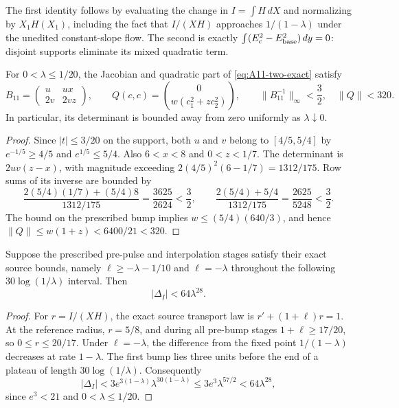 The first identity follows by evaluating the change in
$I=\int H\,dX$ and normalizing by $X_1H(X_1)$, including the
fact that $I/(XH)$ approaches $1/(1-\lambda)$ under the
unedited constant-slope flow. The second is exactly
$\int(E_c^2-E_{\rm base}^2)\,dy=0$: disjoint supports
eliminate its mixed quadratic term.

\begin{proposition}
\label{prop:A11-matrix-bound}
For $0<\lambda\le1/20$, the Jacobian and quadratic part of
\eqref{eq:A11-two-exact} satisfy
\[
 B_{11}=\begin{pmatrix}u&ux\\2v&2vz\end{pmatrix},
 \qquad Q(c,c)=\binom{0}{w(c_1^2+zc_2^2)},
 \qquad\|B_{11}^{-1}\|_\infty<\frac32,\quad\|Q\|<320.
\]
In particular, its determinant is bounded away from zero
uniformly as $\lambda\downarrow0$.
\end{proposition}
\begin{proof}
Since $|t|\le3/20$ on the support, both $u$ and $v$ belong
to $[4/5,5/4]$ by $e^{-1/5}\ge4/5$ and
$e^{1/5}\le5/4$. Also $6<x<8$ and $0<z<1/7$.
The determinant is $2uv(z-x)$, with magnitude exceeding
$2(4/5)^2(6-1/7)=1312/175$. Row sums of its inverse
are bounded by
\[
 \frac{2(5/4)(1/7)+(5/4)8}{1312/175}
 =\frac{3625}{2624}<\frac32,
 \qquad
 \frac{2(5/4)+5/4}{1312/175}
 =\frac{2625}{5248}<\frac32.
\]
The bound on the prescribed bump implies
$w\le(5/4)(640/3)$, and hence
$\|Q\|\le w(1+z)<6400/21<320$.
\end{proof}

\begin{proposition}
\label{prop:A11-discrepancy}
Suppose the prescribed pre-pulse and interpolation stages
satisfy their exact source bounds, namely
$\ell\ge-\lambda-1/10$ and
$\ell=-\lambda$ throughout the following
$30\log(1/\lambda)$ interval. Then
\begin{equation}\label{eq:A11-delta-small}
 |\Delta_I|<64\lambda^{28}.
\end{equation}
\end{proposition}
\begin{proof}
For $r=I/(XH)$, the exact source transport law is
$r'+(1+\ell)r=1$. At the reference radius,
$r=5/8$, and during all pre-bump stages
$1+\ell\ge17/20$, so $0\le r\le20/17$.
Under $\ell=-\lambda$, the difference from the fixed
point $1/(1-\lambda)$ decreases at rate $1-\lambda$.
The first bump lies three units before the end of a plateau
of length $30\log(1/\lambda)$. Consequently
\[
 |\Delta_I|<3e^{3(1-\lambda)}\lambda^{30(1-\lambda)}
 \le3e^3\lambda^{57/2}<64\lambda^{28},
\]
since $e^3<21$ and $0<\lambda\le1/20$.
\end{proof}

